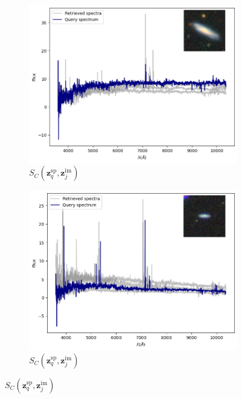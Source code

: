 \documentclass[a4paper,12pt]{article}
\begin{document}
\begin{figure}[H]
    \begin{subfigure}[b]{0.45\textwidth}
        \centering
        \includegraphics[width=\textwidth]{../figures/spectral_retrieval_im_sp_1}
        \caption{$S_C(\mathbf{z}_q^{\text{sp}}, \mathbf{z}_j^{\text{im}})$}
        \label{fig:im_sp_1}
    \end{subfigure}%
    \hfill
    \begin{subfigure}[b]{0.45\textwidth}
        \centering
        \includegraphics[width=\textwidth]{../figures/spectral_retrieval_im_sp_2}
        \caption{$S_C(\mathbf{z}_q^{\text{sp}}, \mathbf{z}_j^{\text{im}})$}
        \label{fig:im_sp_2}
    \end{subfigure}


\end{figure}
\end{document}
